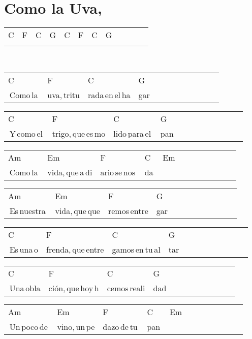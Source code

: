 \section*{Como la Uva, \hfill}
\begin{multicols}{2}
\noindent
\begin{minipage}{\columnwidth}
\noindent
\noindent
\begin{tabular}{llllllllllll}
C&F&C&G&C&F&C&G\\
\quad\quad&\quad\quad&\quad\quad&\quad\quad\quad&\quad\quad&\quad\quad&\quad\quad&
\end{tabular}
\end{minipage}\\

\noindent
\begin{minipage}{\columnwidth}
\noindent
\noindent
\begin{tabular}{llllllllllll}
C&F&C&G\\
\,Como\,la\,&uva,\,tritu&rada\,en\,el\,ha&gar
\end{tabular}

\noindent
\begin{tabular}{llllllllllll}
C&F&C&G\\
\,Y\,como\,el\,&trigo,\,que\,es\,mo&lido\,para\,el\,&pan
\end{tabular}

\noindent
\begin{tabular}{llllllllllll}
Am&Em&F&C&Em\\
\,Como\,la\,&vida,\,que\,a\,di&ario\,se\,nos\,&da\,&
\end{tabular}

\noindent
\begin{tabular}{llllllllllll}
Am&Em&F&G\\
\,Es\,nuestra\,&vida,\,que\,que&remos\,entre&gar
\end{tabular}

\noindent
\begin{tabular}{llllllllllll}
C&F&C&G\\
\,Es\,una\,o&frenda,\,que\,entre&gamos\,en\,tu\,al&tar
\end{tabular}

\noindent
\begin{tabular}{llllllllllll}
C&F&C&G\\
\,Una\,obla&ción,\,que\,hoy\,h&cemos\,reali&dad
\end{tabular}

\noindent
\begin{tabular}{llllllllllll}
Am&Em&F&C&Em\\
\,Un\,poco\,de\,&vino,\,un\,pe&dazo\,de\,tu\,&pan\,&
\end{tabular}


\end{minipage}
\end{multicols}
